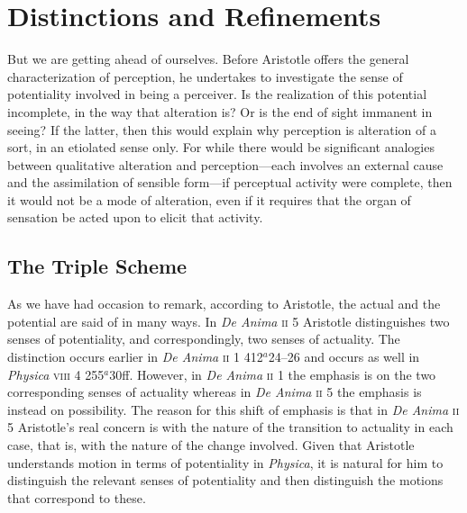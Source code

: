 
\section{Distinctions and Refinements} %
\label{sec:distinctions_and_refinements}

But we are getting ahead of ourselves. Before Aristotle offers the general characterization of perception, he undertakes to investigate the sense of potentiality involved in being a perceiver. Is the realization of this potential incomplete, in the way that alteration is? Or is the end of sight immanent in seeing? If the latter, then this would explain why perception is alteration of a sort, in an etiolated sense only. For while there would be significant analogies between qualitative alteration and perception---each involves an external cause and the assimilation of sensible form---if perceptual activity were complete, then it would not be a mode of alteration, even if it requires that the organ of sensation be acted upon to elicit that activity.


\subsection{The Triple Scheme} %
\label{sub:the_triple_scheme}

As we have had occasion to remark, according to Aristotle, the actual and the potential are said of in many ways. In \emph{De Anima} \textsc{ii} 5 Aristotle distinguishes two senses of potentiality, and correspondingly, two senses of actuality. The distinction occurs earlier in \emph{De Anima} \textsc{ii} 1 412\( ^{a} \)24--26 and occurs as well in \emph{Physica} \textsc{viii} 4 255\( ^{a} \)30ff. However, in \emph{De Anima} \textsc{ii} 1 the emphasis is on the two corresponding senses of actuality whereas in \emph{De Anima} \textsc{ii} 5 the emphasis is instead on possibility. The reason for this shift of emphasis is that in \emph{De Anima} \textsc{ii} 5 Aristotle's real concern is with the nature of the transition to actuality in each case, that is, with the nature of the change involved. Given that Aristotle understands motion in terms of potentiality in \emph{Physica}, it is natural for him to distinguish the relevant senses of potentiality and then distinguish the motions that correspond to these.

